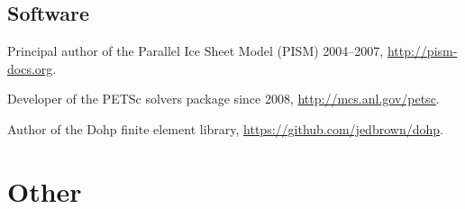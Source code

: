 \documentclass[10pt,letterpaper]{article}
\renewenvironment{itemize}{
  \begin{list}{}{
    \setlength{\leftmargin}{1.5em}
    \setlength{\itemsep}{0.25em}
    \setlength{\parskip}{0pt}
    \setlength{\parsep}{0.25em}
  }
}{
  \end{list}
}
\begin{document}
\subsection*{Software}
\begin{itemize}
\item Principal author of the Parallel Ice Sheet Model (PISM) 2004--2007, \url{http://pism-docs.org}.
\item Developer of the PETSc solvers package since 2008, \url{http://mcs.anl.gov/petsc}.
\item Author of the Dohp finite element library, \url{https://github.com/jedbrown/dohp}.
\end{itemize}


\section*{Other}
\end{document}
